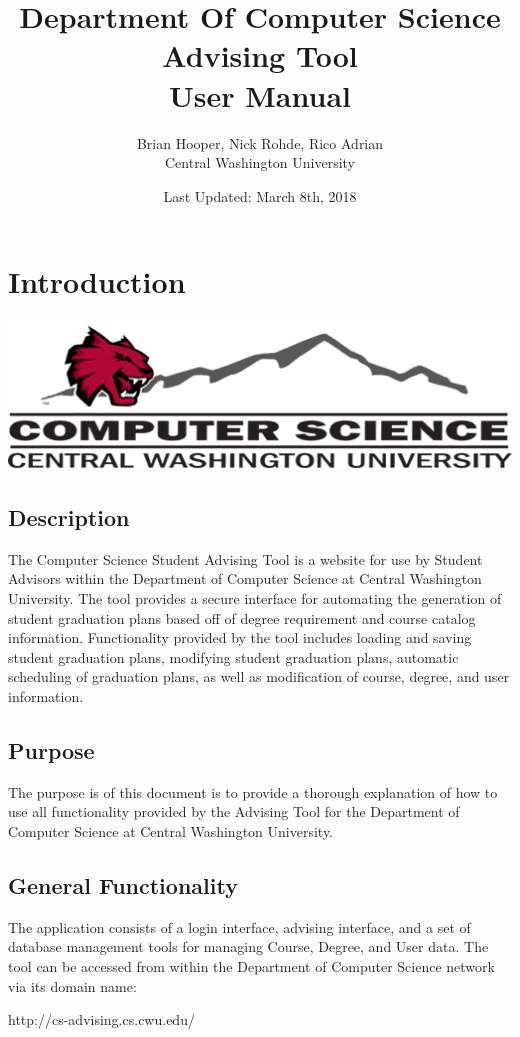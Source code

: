 \documentclass[]{article}
\title{Department Of Computer Science Advising Tool \\ User Manual}
\author{Brian Hooper, Nick Rohde, Rico Adrian \\ Central Washington University}
\date{Last Updated: March 8th, 2018}
\begin{document}
\maketitle
\tableofcontents


\pagebreak\section{Introduction}
	\includegraphics[width=\textwidth]{computer_science_logo.png}
	\subsection{Description}\label{ssec:1}
	
		The Computer Science Student Advising Tool is a website for use by Student Advisors within the Department of Computer Science at Central Washington University. The tool provides a secure interface for automating the generation of student graduation plans based off of degree requirement and course catalog information. Functionality provided by the tool includes loading and saving student graduation plans, modifying student graduation plans, automatic scheduling of graduation plans, as well as modification of course, degree, and user information. 
	\subsection{Purpose}\label{ssec:2}
	
		The purpose is of this document is to provide a thorough explanation of how to use all functionality provided by the Advising Tool for the Department of Computer Science at Central Washington University. 
	\subsection{General Functionality}\label{ssec:3}
	
		The application consists of a login interface, advising interface, and a set of database management tools for managing Course, Degree, and User data. The tool can be accessed from within the Department of Computer Science network via its domain name:
		\begin{center}
			http://cs-advising.cs.cwu.edu/
		\end{center}
\end{document}
